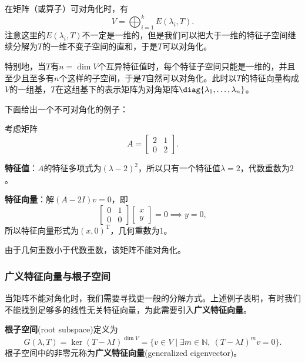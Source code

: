 在矩阵（或算子）可对角化时，有
\begin{equation}
    V = \bigoplus_{i=1}^{k} E(\lambda_i, T).
\end{equation}
注意这里的$E(\lambda_i, T)$不一定是一维的，但是我们可以把大于一维的特征子空间继续分解为$T$的一维不变子空间的直和，于是$T$可以对角化。

特别地，当$T$有$n = \dim V$个互异特征值时，每个特征子空间只能是一维的，并且至少且至多有$n$个这样的子空间，于是$T$自然可以对角化。此时以$T$的特征向量构成$V$的一组基，$T$在这组基下的表示矩阵为对角矩阵$\diag\{\lambda_1, \ldots, \lambda_n\}$。

下面给出一个不可对角化的例子：

\begin{example}
    考虑矩阵
    \begin{equation}
        A = \begin{bmatrix} 2 & 1 \\ 0 & 2 \end{bmatrix}.
    \end{equation}

    \textbf{特征值}：$A$的特征多项式为$(\lambda - 2)^2$，所以只有一个特征值$\lambda = 2$，代数重数为$2$。

    \textbf{特征向量}：解$(A - 2I)v = 0$，即
    \begin{equation}
        \begin{bmatrix} 0 & 1 \\ 0 & 0 \end{bmatrix}\begin{bmatrix} x \\ y \end{bmatrix} = 0 \implies y = 0,
    \end{equation}
    所以特征向量形式为$(x, 0)^{\mathrm{T}}$，几何重数为$1$。

    由于几何重数小于代数重数，该矩阵不能对角化。
\end{example}


\subsubsection{广义特征向量与根子空间}

当矩阵不能对角化时，我们需要寻找更一般的分解方式。上述例子表明，有时我们不能找到足够多的线性无关特征向量，为此需要引入\textbf{广义特征向量}。

\begin{definition}[根子空间]
    \textbf{根子空间}(root subspace)定义为
    \begin{equation}
        G(\lambda, T) = \ker(T - \lambda I)^{\dim V} = \{v \in V \mid \exists m \in \mathbb{N},\ (T - \lambda I)^m v = 0\}.
    \end{equation}
    根子空间中的非零元称为\textbf{广义特征向量}(generalized eigenvector)。
\end{definition}

